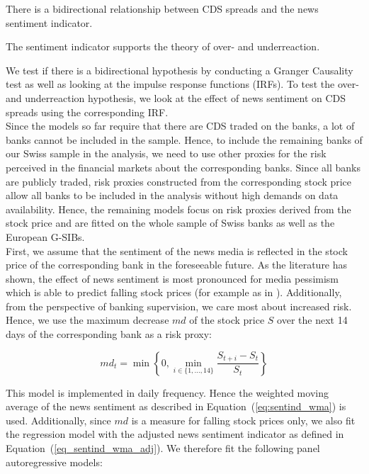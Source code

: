 \begin{hyp}
	There is a bidirectional relationship between CDS spreads and the news sentiment indicator.
\end{hyp}

\begin{hyp}
	The sentiment indicator supports the theory of over- and underreaction.
\end{hyp}

We test if there is a bidirectional hypothesis by conducting a Granger Causality test as well as looking at the impulse response functions (IRFs). To test the over- and underreaction hypothesis, we look at the effect of news sentiment on CDS spreads using the corresponding IRF. \\

Since the models so far require that there are CDS traded on the banks, a lot of banks cannot be included in the sample. Hence, to include the remaining banks of our Swiss sample in the analysis, we need to use other proxies for the risk perceived in the financial markets about the corresponding banks. Since all banks are publicly traded, risk proxies constructed from the corresponding stock price allow all banks to be included in the analysis without high demands on data availability. Hence, the remaining models focus on risk proxies derived from the stock price and are fitted on the whole sample of Swiss banks as well as the European G-SIBs. \\

First, we assume that the sentiment of the news media is reflected in the stock price of the corresponding bank in the foreseeable future. As the literature has shown, the effect of news sentiment is most pronounced for media pessimism which is able to predict falling stock prices (for example as in \citealt{tetlock2007}). Additionally, from the perspective of banking supervision, we care most about increased risk. Hence, we use the maximum decrease $md$ of the stock price $S$ over the next 14 days of the corresponding bank as a risk proxy:

\begin{equation}
	md_t = \min\left\{ 0, \min_{i\in\{1,...,14\}} \frac{S_{t+i}-S_t}{S_t} \right\}
\end{equation}


 This model is implemented in daily frequency. Hence the weighted moving average of the news sentiment as described in \mbox{Equation~(\ref{eq:sentind_wma})} is used. Additionally, since $md$ is a measure for falling stock prices only, we also fit the regression model with the adjusted news sentiment indicator as defined in \mbox{Equation~(\ref{eq_sentind_wma_adj})}. We therefore fit the following panel autoregressive models:

